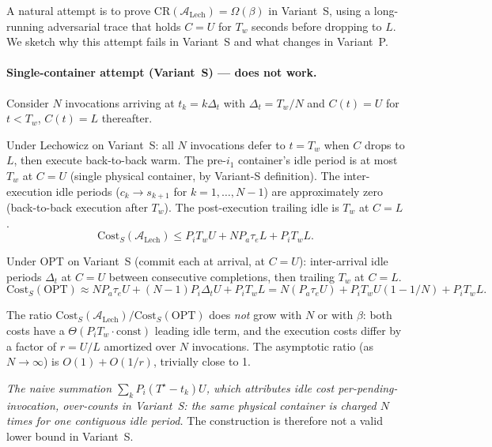 A natural attempt is to prove $\mathrm{CR}(\mathcal{A}_{\text{Lech}})
= \Omega(\beta)$ in Variant~S, using a long-running adversarial trace
that holds $C = U$ for $T_w$ seconds before dropping to $L$. We sketch
why this attempt fails in Variant~S and what changes in Variant~P.

\paragraph{Single-container attempt (Variant~S) — does not work.}
Consider $N$ invocations arriving at $t_k = k\Delta_t$ with
$\Delta_t = T_w/N$ and $C(t) = U$ for $t < T_w$, $C(t) = L$ thereafter.

Under Lechowicz on Variant~S: all $N$ invocations defer to $t = T_w$
when $C$ drops to $L$, then execute back-to-back warm. The pre-$i_1$
container's idle period is at most $T_w$ at $C = U$ (single physical
container, by Variant-S definition). The inter-execution idle periods
($c_k \to s_{k+1}$ for $k=1,\ldots,N-1$) are approximately zero
(back-to-back execution after $T_w$). The post-execution trailing
idle is $T_w$ at $C = L$.
\[
\mathrm{Cost}_S(\mathcal{A}_{\text{Lech}}) \le P_i T_w U + N P_a \tau_e L + P_i T_w L.
\]

Under OPT on Variant~S (commit each at arrival, at $C = U$): inter-arrival
idle periods $\Delta_t$ at $C = U$ between consecutive completions,
then trailing $T_w$ at $C = L$.
\[
\mathrm{Cost}_S(\mathrm{OPT}) \approx N P_a \tau_e U + (N-1) P_i \Delta_t U + P_i T_w L
 = N(P_a \tau_e U) + P_i T_w U (1 - 1/N) + P_i T_w L.
\]

The ratio
$\mathrm{Cost}_S(\mathcal{A}_{\text{Lech}}) / \mathrm{Cost}_S(\mathrm{OPT})$
does \emph{not} grow with $N$ or with $\beta$: both costs have a
$\Theta(P_i T_w \cdot \text{const})$ leading idle term, and the
execution costs differ by a factor of $r = U/L$ amortized over $N$
invocations. The asymptotic ratio (as $N \to \infty$) is
$O(1) + O(1/r)$, trivially close to 1.

\emph{The naive summation $\sum_k P_i (T^\star - t_k) U$, which
attributes idle cost per-pending-invocation, over-counts in
Variant~S: the same physical container is charged $N$ times for one
contiguous idle period.} The construction is therefore not a valid
lower bound in Variant~S.

